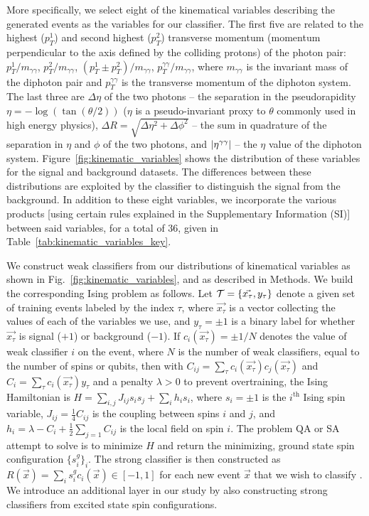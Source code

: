 \documentclass[.chapters/Higgs/.chapters/Higgs/main.tex]{subfiles}
\begin{document}
More specifically, we select eight of the kinematical variables describing the generated events as the variables for our classifier. The first five are related to the highest ($p_T^1$) and second highest ($p_T^2$) transverse momentum (momentum perpendicular to the axis defined by the colliding protons) of the photon pair: 
 $p_T^1/m_{\gamma\gamma}$, $p_T^2/m_{\gamma\gamma}$, $(p_T^1\pm p_T^2)/m_{\gamma\gamma}$, $p_T^{\gamma\gamma}/m_{\gamma\gamma}$, where $m_{\gamma\gamma}$ is the invariant mass of the diphoton pair and $p_T^{\gamma\gamma}$ is the transverse momentum of the diphoton system. The last three are $\Delta\eta$ of the two photons -- the separation in the pseudorapidity  $\eta = -\log(\tan(\theta/2))$ ($\eta$ is a pseudo-invariant proxy to $\theta$ commonly used in high energy physics), $\Delta R = \sqrt{\Delta\eta^2+\Delta\phi^2}$ -- the sum in quadrature of the separation in $\eta$ and $\phi$ of the two photons, and $\abs{\eta^{\gamma\gamma}}$ -- the $\eta$ value of the diphoton system.
Figure~\ref{fig:kinematic_variables} shows the distribution of these variables for the signal and background datasets. The differences between these distributions are exploited by the classifier  to distinguish the signal from the background. In addition to these eight variables, we incorporate the various products [using certain rules explained in the Supplementary Information (SI)] between said variables, for a total of $36$, given in Table~\ref{tab:kinematic_variables_key}.
 

We construct weak classifiers from our distributions of kinematical variables as shown in Fig.~\ref{fig:kinematic_variables}, and as described in Methods. We build the corresponding Ising problem as follows\cite{Pudenz:2013kx}. Let $\mathcal{T} = \{\vec{x_\tau}, y_\tau\}$ denote a given set of training events labeled by the index ${\tau}$, where $\vec{x_\tau}$ is a vector collecting the values of each of the variables we use, and $y_\tau =\pm 1$ is a binary label for whether $\vec{x_\tau}$ is signal ($+1$) or background ($-1$).  If $c_i(\vec{x_\tau})=\pm 1/N$ denotes the value of weak classifier $i$ on the event, where $N$ is the number of weak classifiers, equal to the number of spins or qubits, then with $C_{ij} = \sum_\tau c_i(\vec{x_\tau})c_j(\vec{x_\tau})$ and $C_i = \sum_\tau c_i(\vec{x_\tau}) y_\tau$ and a penalty $\lambda>0$ to prevent overtraining, the Ising Hamiltonian is $H = \sum_{i,j} J_{ij} s_i s_j + \sum_i h_i  s_i$, where $s_i=\pm 1$ is the $i^\textrm{th}$ Ising spin variable, $J_{ij} = \frac{1}{4} C_{ij}$ is the coupling between spins $i$ and $j$, and $h_i =  \lambda-C_i+\frac{1}{2}\sum_{j=1} C_{ij}$ is the local field on spin $i$. The problem QA or SA attempt to solve is to minimize $H$ and return the minimizing, ground state spin configuration $\{s^g_i\}_i$. The strong classifier is then constructed as $R(\vec{x}) = \sum_i s^g_i c_i(\vec{x})\in[-1,1]$ for each new event $\vec{x}$ that we wish to classify \cite{Pudenz:2013kx}. We introduce an additional layer in our study by also constructing strong classifiers from excited state spin configurations.
\end{document}
